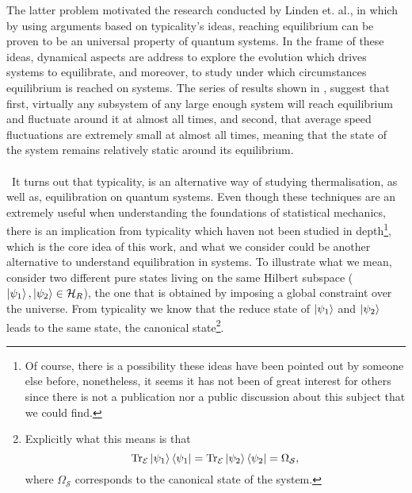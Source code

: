 \indent The latter problem motivated the research conducted by Linden et. al.\cite{linden_quantum_2009}, in which by using arguments based on typicality's ideas, reaching equilibrium can be proven to be an universal property of quantum systems. In the frame of these ideas, dynamical aspects are address to explore the evolution which drives systems to equilibrate, and moreover, to study under which circumstances equilibrium is reached on systems. The series of results shown in \cite{linden_quantum_2009,linden_speed_2010,malabarba_quantum_2014}, suggest that first, virtually any subsystem of any large enough system will reach equilibrium and fluctuate around it at almost all times, and second, that average speed fluctuations are extremely small at almost all times, meaning that the state of the system remains relatively static around its equilibrium. \\\\\
\indent It turns out that typicality, is an alternative way of studying thermalisation, as well as, equilibration on quantum systems. Even though these techniques are an extremely useful when understanding the foundations of statistical mechanics, there is an implication from typicality which haven not been studied in depth\footnote{Of course, there is a possibility these ideas have been pointed out by someone else before, nonetheless, it seems it has not been of great interest for others since there is not a publication nor a public discussion about this subject that we could find.}, which is the core idea of this work, and what we consider could be another alternative to understand equilibration in systems. To illustrate what we mean, consider two different pure states living on the same Hilbert subspace ($\mathinner{|{\psi_1}\rangle},\mathinner{|{\psi_2}\rangle} \in \mathcal{H}_{R}$), the one that is obtained by imposing a global constraint over the universe. From typicality we know that the reduce state of $\mathinner{|{\psi_1}\rangle}$ and $\mathinner{|{\psi_2}\rangle}$ leads to the same state, the canonical state\footnote{Explicitly what this means is that
\begin{equation*}
\operatorname{Tr}_{\mathcal{E}}\mathinner{|{\psi_1}\rangle}\mathinner{\langle{\psi_1}|}=\operatorname{Tr}_{\mathcal{E}}\mathinner{|{\psi_2}\rangle}\mathinner{\langle{\psi_2}|}=\Omega_{\mathcal{S}},
\end{equation*}
where $\Omega_{\mathcal{S}}$ corresponds to the canonical state of the system.}.
